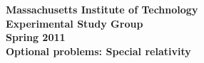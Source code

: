 \setlength{\unitlength}{1.cm}
\doublerulesep -1pt 
\textwidth=6.5in 
\textheight=9.5in
\hoffset=-1cm 
\voffset=-1in 
\pagestyle{empty}


\begin{center}
{\bf\sc Massachusetts Institute of Technology}\\
{\bf\sc Experimental Study Group}\\
{\bf{} Spring 2011}\\
\bigskip
{\bf\sc Optional problems: Special relativity}\\
\end{center}

